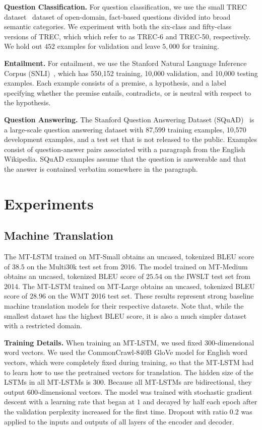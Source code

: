 \documentclass{article}
\begin{document}
\textbf{Question Classification.} 
For question classification, 
we use the small TREC dataset~\citep{voorhees1999trec} dataset of open-domain, fact-based questions divided into broad semantic categories.
We experiment with both the six-class and fifty-class versions of TREC,
which which refer to as TREC-6 and TREC-50, respectively.
We hold out $452$ examples for validation and leave $5,000$ for training.

\textbf{Entailment.}
For entailment, 
we use the Stanford Natural Language Inference Corpus (SNLI)~\citep{bowman2015snli}, 
which has 550,152 training, 
10,000 validation,
and 10,000 testing examples.
Each example consists of a premise, 
a hypothesis, 
and a label specifying whether the premise entails, contradicts, 
or is neutral with respect to the hypothesis.

\textbf{Question Answering.}
The Stanford Question Answering Dataset
(SQuAD)~\citep{rajpurkar2016squad} 
is a large-scale question answering dataset 
with 87,599 training examples,
10,570 development examples,
and a test set that is not released to the public.
Examples consist of question-answer pairs associated with a paragraph from the English Wikipedia.
SQuAD examples assume that the question is answerable and that the answer is contained verbatim somewhere in the paragraph.
 \section{Experiments}
\subsection{Machine Translation}
The MT-LSTM trained on MT-Small obtains an uncased,
tokenized BLEU score of $38.5$ on the Multi30k test set from 2016.
The model trained on MT-Medium obtains an uncased, 
tokenized BLEU score of $25.54$ on the IWSLT test set from 2014.
The MT-LSTM trained on MT-Large obtains an uncased, 
tokenized BLEU score of $28.96$ on the WMT 2016 test set.
These results represent strong baseline machine translation models for their respective datasets. 
Note that, while the smallest dataset has the highest BLEU score, 
it is also a much simpler dataset with a restricted domain.

\textbf{Training Details. } 
When training an MT-LSTM,
we used fixed 300-dimensional word vectors.
We used the CommonCrawl-840B GloVe model for English word vectors,
which were completely fixed during training,
so that the MT-LSTM had to learn how to use the pretrained vectors for translation.
The hidden size of the LSTMs in all MT-LSTMs is 300. 
Because all MT-LSTMs are bidirectional,
they output 600-dimensional vectors.
The model was trained with stochastic gradient descent with a learning rate that began at $1$ and decayed by half each epoch after the validation perplexity increased for the first time.
Dropout with ratio $0.2$ was applied to the inputs and outputs of all layers of the encoder and decoder.
\end{document}
